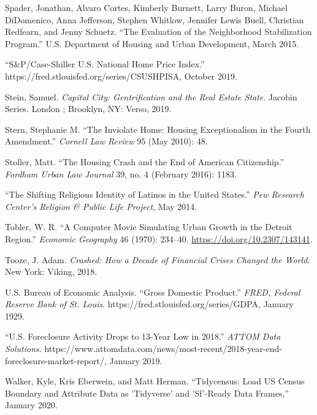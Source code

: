 \documentclass[12pt,oneside]{psthesis}
\begin{document}
\leavevmode\hypertarget{ref-spader2015evaluation}{}%
Spader, Jonathan, Alvaro Cortes, Kimberly Burnett, Larry Buron, Michael DiDomenico, Anna Jefferson, Stephen Whitlow, Jennifer Lewis Buell, Christian Redfearn, and Jenny Schuetz. ``The Evaluation of the Neighborhood Stabilization Program.'' U.S. Department of Housing and Urban Development, March 2015.

\leavevmode\hypertarget{ref-2019caseshiller}{}%
``S\&P/Case-Shiller U.S. National Home Price Index.'' https://fred.stlouisfed.org/series/CSUSHPISA, October 2019.

\leavevmode\hypertarget{ref-stein2019capital}{}%
Stein, Samuel. \emph{Capital City: Gentrification and the Real Estate State}. Jacobin Series. London ; Brooklyn, NY: Verso, 2019.

\leavevmode\hypertarget{ref-stern2010inviolate}{}%
Stern, Stephanie M. ``The Inviolate Home: Housing Exceptionalism in the Fourth Amendment.'' \emph{Cornell Law Review} 95 (May 2010): 48.

\leavevmode\hypertarget{ref-stollerHousingCrashEnd2016}{}%
Stoller, Matt. ``The Housing Crash and the End of American Citizenship.'' \emph{Fordham Urban Law Journal} 39, no. 4 (February 2016): 1183.

\leavevmode\hypertarget{ref-2014shifting}{}%
``The Shifting Religious Identity of Latinos in the United States.'' \emph{Pew Research Center's Religion \& Public Life Project}, May 2014.

\leavevmode\hypertarget{ref-tobler1970computer}{}%
Tobler, W. R. ``A Computer Movie Simulating Urban Growth in the Detroit Region.'' \emph{Economic Geography} 46 (1970): 234--40. \url{https://doi.org/10.2307/143141}.

\leavevmode\hypertarget{ref-toozeCrashedHowDecade2018}{}%
Tooze, J. Adam. \emph{Crashed: How a Decade of Financial Crises Changed the World}. New York: Viking, 2018.

\leavevmode\hypertarget{ref-usbureauofeconomicanalysis1929gross}{}%
U.S. Bureau of Economic Analysis. ``Gross Domestic Product.'' \emph{FRED, Federal Reserve Bank of St. Louis}. https://fred.stlouisfed.org/series/GDPA, January 1929.

\leavevmode\hypertarget{ref-2019foreclosure}{}%
``U.S. Foreclosure Activity Drops to 13-Year Low in 2018.'' \emph{ATTOM Data Solutions}. https://www.attomdata.com/news/most-recent/2018-year-end-foreclosure-market-report/, January 2019.

\leavevmode\hypertarget{ref-walker2020tidycensus}{}%
Walker, Kyle, Kris Eberwein, and Matt Herman. ``Tidycensus: Load US Census Boundary and Attribute Data as 'Tidyverse' and 'Sf'-Ready Data Frames,'' January 2020.
\end{document}
